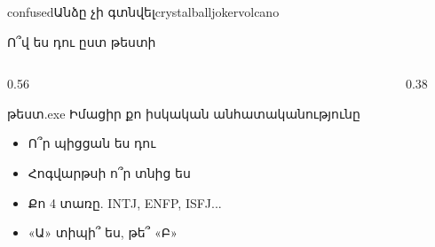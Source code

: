 
%
  {   }%
  {confused}{Անձը չի գտնվել}{{crystalball}{joker}{volcano}}

\begin{frame}{Ո՞վ ես դու ըստ թեստի}
  \begin{columns}[c]
    \begin{column}{0.56\textwidth}
      \begin{popup}{թեստ.exe}
        {\blackfont\large Իմացիր քո իսկական անհատականությունը}\par\smallskip
        \begin{itemize}
          \item<2-> Ո՞ր պիցցան ես դու 
          \item<3-> Հոգվարթսի ո՞ր տնից ես 
          \item<4-> Քո 4 տառը. INTJ, ENFP, ISFJ...
          \item<5-> «Ա» տիպի՞ ես, թե՞ «Բ»
        \end{itemize}
      \end{popup}
    \end{column}
    \begin{column}{0.38\textwidth}
      \centering
      \par\medskip
    \end{column}
  \end{columns}
\end{frame}

